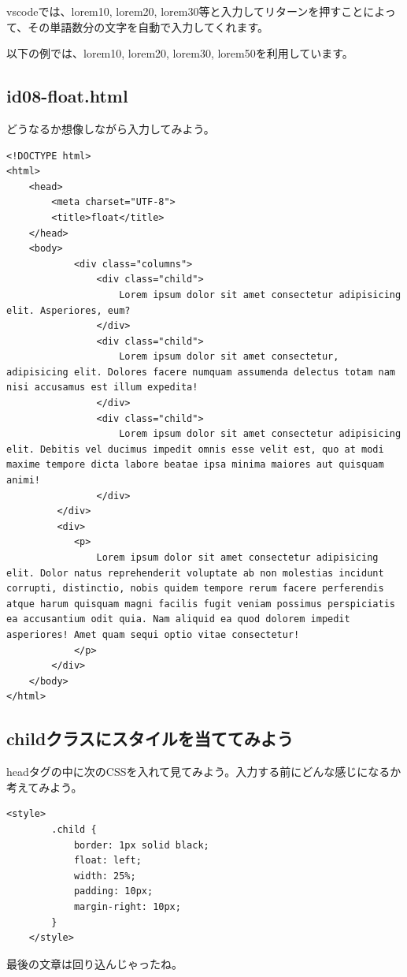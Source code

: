 \documentclass[mingoth,11pt,a4j,uplatex,dvipdfmx]{jsarticle}
\begin{document}
vscodeでは、lorem10, lorem20, lorem30等と入力してリターンを押すことによって、その単語数分の文字を自動で入力してくれます。

以下の例では、lorem10, lorem20, lorem30, lorem50を利用しています。



\subsection{id08-float.html}
どうなるか想像しながら入力してみよう。
\begin{lstlisting}[caption=HTML部分]
<!DOCTYPE html>
<html>
	<head>
		<meta charset="UTF-8">
		<title>float</title>
	</head>
	<body>
    		<div class="columns">
		        <div class="child">
		            Lorem ipsum dolor sit amet consectetur adipisicing elit. Asperiores, eum?
		        </div>
		        <div class="child">
		            Lorem ipsum dolor sit amet consectetur, adipisicing elit. Dolores facere numquam assumenda delectus totam nam nisi accusamus est illum expedita!
		        </div>
		        <div class="child">
		            Lorem ipsum dolor sit amet consectetur adipisicing elit. Debitis vel ducimus impedit omnis esse velit est, quo at modi maxime tempore dicta labore beatae ipsa minima maiores aut quisquam animi!
		        </div>
		 </div>
		 <div>
			<p>
				Lorem ipsum dolor sit amet consectetur adipisicing elit. Dolor natus reprehenderit voluptate ab non molestias incidunt corrupti, distinctio, nobis quidem tempore rerum facere perferendis atque harum quisquam magni facilis fugit veniam possimus perspiciatis ea accusantium odit quia. Nam aliquid ea quod dolorem impedit asperiores! Amet quam sequi optio vitae consectetur!
			</p>
		</div>
	</body>
</html>
\end{lstlisting}


\subsection{childクラスにスタイルを当ててみよう}
headタグの中に次のCSSを入れて見てみよう。入力する前にどんな感じになるか考えてみよう。
\begin{lstlisting}[caption=CSS部分1]
    <style>
        .child {
            border: 1px solid black;
            float: left;
            width: 25%;
            padding: 10px;
            margin-right: 10px;
        }
    </style>

\end{lstlisting}
最後の文章は回り込んじゃったね。
\end{document}
